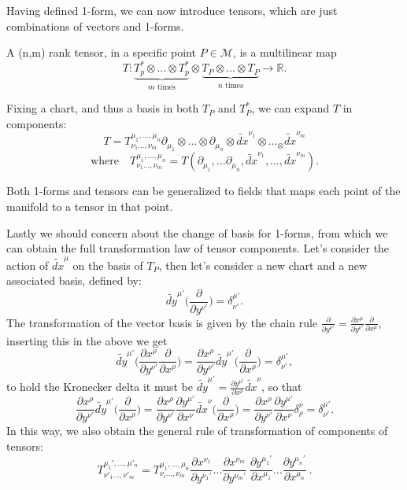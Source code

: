 Having defined 1-form, we can now introduce tensors, which are just combinations of vectors and 1-forms.
\begin{defin}[Tensors]
	A (n,m) rank tensor, in a specific point $P\in\mathcal{M}$, is a multilinear map $$T: \underbrace{T_p^*\otimes\dots\otimes  T_p^*}_\text{$m$ times}\otimes \underbrace{T_P\otimes \dots \otimes T_P}_\text{$n$ times}\longrightarrow \mathbb{R} .$$
\end{defin}
Fixing a chart, and thus a basis in both $T_P$ and $T_P^*$, we can expand $T$ in components:
$$\boxed{T=T^{\mu_1,\dots,\mu_n}_{\nu_1\dots,\nu_m}\partial_{\mu_1}\otimes\dots\otimes\partial_{\mu_n}\otimes\tilde{dx}^{\nu_1}\otimes\dots_\otimes\tilde{dx}^{\nu_m}}$$$$ \text{where}\quad T^{\mu_1,\dots,\mu_n}_{\nu_1\dots,\nu_m}=T(\partial_{\mu_1},\dots\partial_{\mu_n},\tilde{dx}^{\nu_1},\dots,\tilde{dx}^{\nu_m}).$$

Both 1-forms and tensors can be generalized to fields that maps each point of the manifold to a tensor in that point.

Lastly we should concern about the change of basis for 1-forms, from which we can obtain the full transformation law of tensor components. Let's consider the action of $\tilde{dx}^\mu$ on the basis of $T_P$, then let's consider a new chart and a new associated basis, defined by: $$\tilde{dy}^{\mu'}\bigg(\frac{\partial}{\partial y^{\nu'}}\bigg)=\delta^{\mu'}_{\nu'}.$$
The transformation of the vector basis is given by the chain rule $\frac{\partial}{\partial y^{\nu'}}=\frac{\partial x^\mu}{\partial y^{\nu'}}\frac{\partial}{\partial x^{\mu}}$, inserting this in the above we get $$\tilde{dy}^{\mu'}\bigg(\frac{\partial x^\rho}{\partial y^{\nu'}}\frac{\partial}{\partial x^{\rho}}\bigg)=\frac{\partial x^\rho}{\partial y^{\nu'}}\tilde{dy}^{\mu'}\bigg(\frac{\partial}{\partial x^{\rho}}\bigg)=\delta^{\mu'}_{\nu'},$$
to hold the Kronecker delta it must be $\tilde{dy}^{\mu'}=\frac{\partial y^{\mu'}}{\partial x^{\nu}}\tilde{dx}^{\nu}$, so that$$\frac{\partial x^\rho}{\partial y^{\nu'}}\tilde{dy}^{\mu'}\bigg(\frac{\partial}{\partial x^{\rho}}\bigg)=\frac{\partial x^\rho}{\partial y^{\nu'}}\frac{\partial y^{\mu'}}{\partial x^{\nu}}\tilde{dx}^{\nu}\bigg(\frac{\partial}{\partial x^{\rho}}\bigg)=\frac{\partial x^\rho}{\partial y^{\nu'}}\frac{\partial y^{\mu'}}{\partial x^{\nu}}\delta^\nu_\rho=\delta^{\mu'}_{\nu'}.$$
In this way, we also obtain the general rule of transformation of components of tensors:
$$\boxed{T^{\mu_1',\dots,\mu'_n}_{\nu'_1\dots,\nu'_m}=T^{\mu_1,\dots,\mu_n}_{\nu_i\dots,\nu_m}\frac{\partial x^{\nu_1}}{\partial y^{\nu_1'}}\dots\frac{\partial x^{\nu_m}}{\partial y^{\nu_m'}}\ \frac{\partial y^{\mu_1'}}{\partial x^{\mu_1}}\dots\frac{\partial y^{\mu_n'}}{\partial x^{\mu_n}}}\ .$$
